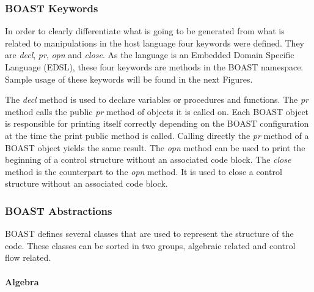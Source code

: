 \documentclass{IEEEtran}
\begin{document}
\subsubsection{BOAST Keywords}

In order to clearly differentiate what is going to be generated from what is
related to manipulations in the host language four keywords were defined. They
are \emph{decl}, \emph{pr}, \emph{opn} and \emph{close}. As the language is an
Embedded Domain Specific Language (EDSL), these four keywords are methods in
the BOAST namespace. Sample usage of these keywords will be found in the next
Figures.

The \emph{decl} method is used to declare variables or procedures and functions. 
The \emph{pr} method calls the public \emph{pr} method of objects it is
called on. Each BOAST object is responsible for printing itself correctly
depending on the BOAST configuration at the time the print public method is
called. Calling directly the \emph{pr} method of a BOAST object yields the same
result. The \emph{opn} method can be used to print the beginning of a control
structure without an associated code block.
The \emph{close} method is the counterpart to the \emph{opn} method. It is used
to close a control structure without an associated code block.

\subsubsection{BOAST Abstractions}

BOAST defines several classes that are used to represent the structure of the
code. These classes can be sorted in two groups, algebraic related and control
flow related.

\paragraph{Algebra}
\end{document}

